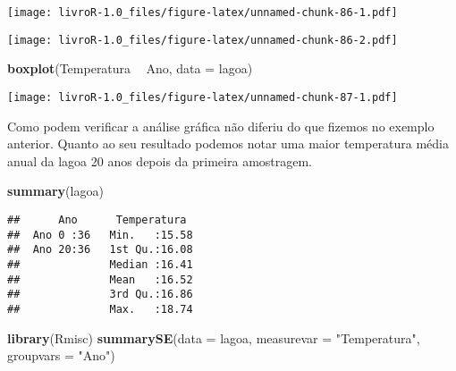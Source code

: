 \documentclass[]{book}
\newenvironment{Shaded}{\begin{snugshade}}{\end{snugshade}}
\newcommand{\DataTypeTok}[1]{\textcolor[rgb]{0.13,0.29,0.53}{#1}}
\newcommand{\DecValTok}[1]{\textcolor[rgb]{0.00,0.00,0.81}{#1}}
\newcommand{\KeywordTok}[1]{\textcolor[rgb]{0.13,0.29,0.53}{\textbf{#1}}}
\newcommand{\NormalTok}[1]{#1}
\newcommand{\OperatorTok}[1]{\textcolor[rgb]{0.81,0.36,0.00}{\textbf{#1}}}
\newcommand{\StringTok}[1]{\textcolor[rgb]{0.31,0.60,0.02}{#1}}
\begin{document}
\texttt{[image: livroR-1.0\_files/figure-latex/unnamed-chunk-86-1.pdf]}

\begin{Shaded}
\end{Shaded}

\texttt{[image: livroR-1.0\_files/figure-latex/unnamed-chunk-86-2.pdf]}

\begin{Shaded}
\begin{Highlighting}[]
\KeywordTok{boxplot}\NormalTok{(Temperatura }\OperatorTok{~}\StringTok{ }\NormalTok{Ano, }\DataTypeTok{data =}\NormalTok{ lagoa)}
\end{Highlighting}
\end{Shaded}

\texttt{[image: livroR-1.0\_files/figure-latex/unnamed-chunk-87-1.pdf]}

Como podem verificar a análise gráfica não diferiu do que fizemos no exemplo anterior. Quanto ao seu resultado podemos notar uma maior temperatura média anual da lagoa 20 anos depois da primeira amostragem.

\begin{Shaded}
\begin{Highlighting}[]
\KeywordTok{summary}\NormalTok{(lagoa)}
\end{Highlighting}
\end{Shaded}

\begin{verbatim}
##      Ano      Temperatura   
##  Ano 0 :36   Min.   :15.58  
##  Ano 20:36   1st Qu.:16.08  
##              Median :16.41  
##              Mean   :16.52  
##              3rd Qu.:16.86  
##              Max.   :18.74
\end{verbatim}

\begin{Shaded}
\begin{Highlighting}[]
\KeywordTok{library}\NormalTok{(Rmisc)}
\KeywordTok{summarySE}\NormalTok{(}\DataTypeTok{data =}\NormalTok{ lagoa, }\DataTypeTok{measurevar =} \StringTok{"Temperatura"}\NormalTok{, }\DataTypeTok{groupvars =} \StringTok{"Ano"}\NormalTok{)}
\end{Highlighting}
\end{Shaded}
\end{document}
